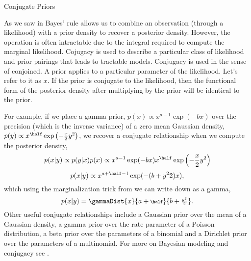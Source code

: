 \begin{boxfloat}
  \caption{Conjugate Priors}\label{box:conjugacy}
  \boxfontsize

  As we saw in  Bayes' rule
  allows us to combine an observation (through a likelihood) with a
  prior density to recover a posterior density. However, the operation
  is often intractable due to the integral required to compute the
  marginal likelihood. Cojugacy is used to describe a particular class
  of likelihood and prior pairings that leads to tractable
  models. Conjugacy is used in the sense of conjoined. A prior applies
  to a particular parameter of the likelihood. Let's refer to it as
  $x$. If the prior is conjugate to the likelihood, then the
  functional form of the posterior density after multiplying by the
  prior will be identical to the prior.

  For example, if we place a gamma prior, $p(x) \propto
  x^{a-1}\exp(-bx)$ over the precision (which is the inverse variance)
  of a zero mean Gaussian density, $p(y) \propto
  x^{\half}\exp\left(-\frac{x}{2}y^2\right)$, we recover a
  conjugate relationship when we compute the posterior density,
  \[
  p(x|y) \propto p(y|x)p(x) \propto
  x^{a-1}\exp(-bx)x^{\half}\exp\left(-\frac{x}{2}y^2\right)
  \]
  \[
  p(x|y) \propto x^{a+\half-1}\exp(-(b+{y^2}{2})x),
  \]
  which using the marginalization trick from
   we can write down as a gamma,
  \[
  p(x|y) = \gammaDist{x}{a+{\scriptstyle \half}}{b+{\scriptstyle
      \frac{y^2}{2}}}.
  \]
  Other useful conjugate relationships include a Gaussian prior over
  the mean of a Gaussian density, a gamma prior over the rate
  parameter of a Poisson distribution, a beta prior over the
  parameters of a binomial and a Dirichlet prior over the
  parameters of a multinomial. For more on Bayesian modeling and
  conjugacy see \cite{Gelman:bayesian95}.
\end{boxfloat}

